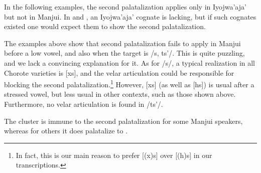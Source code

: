 In the following examples, the second palatalization applies only in Iyojwa’aja’ but not in Manjui. In  and , an Iyojwa’aja’ cognate is lacking, but if such cognates existed one would expect them to show the second palatalization.

\begin{exe}
    \ex {}
    \ex {}
    \ex {}
    \ex {}
    \ex {}\label{u-i-pilusah}
    \ex {}
    \ex {}
    \ex {}\label{u-i-jisuun}
    \ex {}
    \ex {}\label{ints'eik}
    \ex {}
\end{exe}

The examples above show that second palatalization fails to apply in Manjui before a low vowel, and also when the target is /s, ts'/. This is quite puzzling, and we lack a convincing explanation for it. As for /s/, a typical realization in all Chorote varieties is [xs], and the velar articulation could be responsible for blocking the second palatalization.\footnote{In fact, this is our main reason to prefer [(x)s] over [(h)s] in our transcriptions.} However, [xs] (as well as [hs]) is usual after a stressed vowel, but less usual in other contexts, such as those shown above. Furthermore, no velar articulation is found in /ts'/.

The cluster  is immune to the second palatalization for some Manjui speakers, whereas for others it does palatalize to .

\begin{exe}
    \ex {}
    \ex {}
    \ex {}
    \ex {}
\end{exe}

